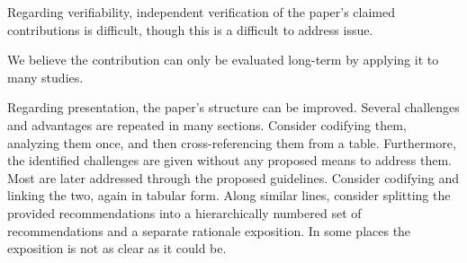 \documentclass[12pt,english]{reviewresponse}
\begin{document}
\begin{revcomment}
    Regarding verifiability, independent verification of the paper's claimed contributions is difficult, though this is a difficult to address issue.
\end{revcomment}
\begin{revresponse}
    We believe the contribution can only be evaluated long-term by applying it to many studies.
\end{revresponse}

\begin{revcomment}
    Regarding presentation, the paper's structure can be improved. Several challenges and advantages are repeated in many sections. Consider codifying them, analyzing them once, and then cross-referencing them from a table. Furthermore, the identified challenges are given without any proposed means to address them. Most are later addressed through the proposed guidelines. Consider codifying and linking the two, again in tabular form. Along similar lines,  consider splitting the provided recommendations into a hierarchically numbered set of recommendations and a separate rationale exposition. In some places the exposition is not as clear as it could be.
\end{revcomment}
\end{document}
